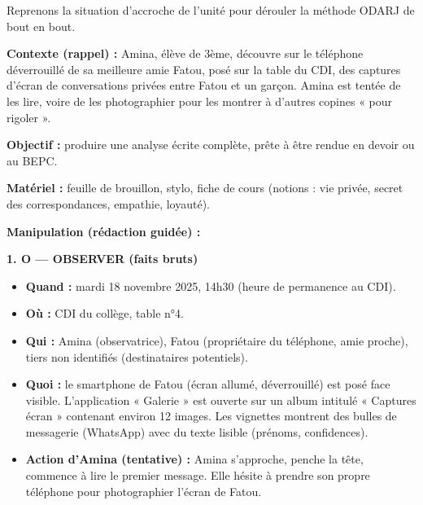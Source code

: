 \documentclass[11pt]{article}
\begin{document}
Reprenons la situation d'accroche de l'unité pour dérouler la méthode ODARJ de bout en bout.

\begin{center}
\begin{minipage}{0.92\linewidth}
\textbf{Contexte (rappel) :} Amina, élève de 3ème, découvre sur le téléphone déverrouillé de sa meilleure amie Fatou, posé sur la table du CDI, des captures d'écran de conversations privées entre Fatou et un garçon. Amina est tentée de les lire, voire de les photographier pour les montrer à d'autres copines « pour rigoler ».
\end{minipage}
\end{center}

\vspace{0.5em}

\begin{experience}
\textbf{Objectif :} produire une analyse écrite complète, prête à être rendue en devoir ou au BEPC.

\textbf{Matériel :} feuille de brouillon, stylo, fiche de cours (notions : vie privée, secret des correspondances, empathie, loyauté).

\textbf{Manipulation (rédaction guidée) :}

\noindent\textbf{1. O — OBSERVER (faits bruts)}
\begin{itemize}
    \item \textbf{Quand :} mardi 18 novembre 2025, 14h30 (heure de permanence au CDI).
    \item \textbf{Où :} CDI du collège, table n°4.
    \item \textbf{Qui :} Amina (observatrice), Fatou (propriétaire du téléphone, amie proche), tiers non identifiés (destinataires potentiels).
    \item \textbf{Quoi :} le smartphone de Fatou (écran allumé, déverrouillé) est posé face visible. L'application « Galerie » est ouverte sur un album intitulé « Captures écran » contenant environ 12 images. Les vignettes montrent des bulles de messagerie (WhatsApp) avec du texte lisible (prénoms, confidences).
    \item \textbf{Action d'Amina (tentative) :} Amina s'approche, penche la tête, commence à lire le premier message. Elle hésite à prendre son propre téléphone pour photographier l'écran de Fatou.
\end{itemize}


\end{experience}
\end{document}
